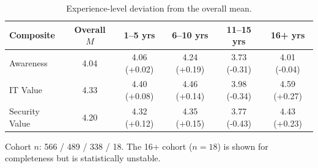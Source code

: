 \begin{table}[ht]
\centering
\caption{Experience-level deviation from the overall mean.}
\label{tab:exp_deviation}
\small
\begin{tabular}{lccccc}
\toprule
Composite & Overall $M$ & 1--5 yrs & 6--10 yrs & 11--15 yrs & 16+ yrs \\
\midrule
Awareness & 4.04 & 4.06 (+0.02) & 4.24 (+0.19) & 3.73 (-0.31) & 4.01 (-0.04) \\
IT Value & 4.33 & 4.40 (+0.08) & 4.46 (+0.14) & 3.98 (-0.34) & 4.59 (+0.27) \\
Security Value & 4.20 & 4.32 (+0.12) & 4.35 (+0.15) & 3.77 (-0.43) & 4.43 (+0.23) \\
\bottomrule
\end{tabular}

\smallskip
\footnotesize Cohort $n$: 566 / 489 / 338 / 18. The 16+ cohort ($n=18$) is shown for completeness but is statistically unstable.
\end{table}
